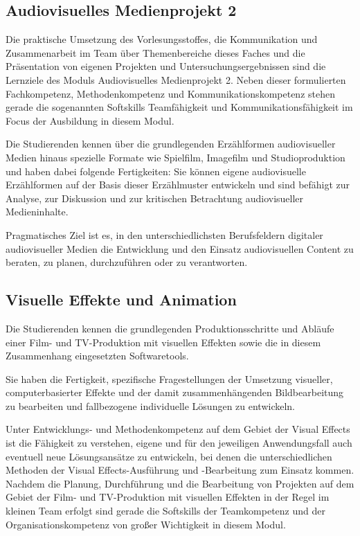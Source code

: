 \subsection*{Audiovisuelles Medienprojekt
2}\label{audiovisuelles-medienprojekt-2}

Die praktische Umsetzung des Vorlesungsstoffes, die Kommunikation und
Zusammenarbeit im Team über Themenbereiche dieses Faches und die
Präsentation von eigenen Projekten und Untersuchungsergebnissen sind die
Lernziele des Moduls Audiovisuelles Medienprojekt 2. Neben dieser
formulierten Fachkompetenz, Methodenkompetenz und
Kommunikationskompetenz stehen gerade die sogenannten Softskills
Teamfähigkeit und Kommunikationsfähigkeit im Focus der Ausbildung in
diesem Modul.

Die Studierenden kennen über die grundlegenden Erzählformen
audiovisueller Medien hinaus spezielle Formate wie Spielfilm, Imagefilm
und Studioproduktion und haben dabei folgende Fertigkeiten: Sie können
eigene audiovisuelle Erzählformen auf der Basis dieser Erzählmuster
entwickeln und sind befähigt zur Analyse, zur Diskussion und zur
kritischen Betrachtung audiovisueller Medieninhalte.

Pragmatisches Ziel ist es, in den unterschiedlichsten Berufsfeldern
digitaler audiovisueller Medien die Entwicklung und den Einsatz
audiovisuellen Content zu beraten, zu planen, durchzuführen oder zu
verantworten.

\subsection*{Visuelle Effekte und
Animation}\label{visuelle-effekte-und-animation}

Die Studierenden kennen die grundlegenden Produktionsschritte und
Abläufe einer Film- und TV-Produktion mit visuellen Effekten sowie die
in diesem Zusammenhang eingesetzten Softwaretools.

Sie haben die Fertigkeit, spezifische Fragestellungen der Umsetzung
visueller, computerbasierter Effekte und der damit zusammenhängenden
Bildbearbeitung zu bearbeiten und fallbezogene individuelle Lösungen zu
entwickeln.

Unter Entwicklungs- und Methodenkompetenz auf dem Gebiet der Visual
Effects ist die Fähigkeit zu verstehen, eigene und für den jeweiligen
Anwendungsfall auch eventuell neue Lösungsansätze zu entwickeln, bei
denen die unterschiedlichen Methoden der Visual Effects-Ausführung und
-Bearbeitung zum Einsatz kommen. Nachdem die Planung, Durchführung und
die Bearbeitung von Projekten auf dem Gebiet der Film- und TV-Produktion
mit visuellen Effekten in der Regel im kleinen Team erfolgt sind gerade
die Softskills der Teamkompetenz und der Organisationskompetenz von
großer Wichtigkeit in diesem Modul.

